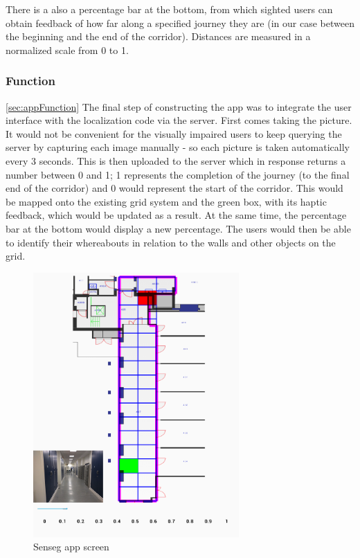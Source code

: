 There is a also a percentage bar at the bottom, from which sighted users can obtain feedback of how far along a specified journey they are (in our case between the beginning and the end of the corridor). Distances are measured in a normalized scale from 0 to 1.

\subsubsection{Function}
\ref{sec:appFunction}
The final step of constructing the app was to integrate the user interface with the localization code via the server. First comes taking the picture. It would not be convenient for the visually impaired users to keep querying the server by capturing each image manually - so each picture is taken automatically every 3 seconds. This is then uploaded to the server which in response returns a number between 0 and 1; 1 represents the completion of the journey (to the final end of the corridor) and 0 would represent the start of the corridor. This would be mapped onto the existing grid system and the green box, with its haptic feedback, which would be updated as a result. At the same time, the percentage bar at the bottom would display a new percentage. The users would then be able to identify their whereabouts in relation to the walls and other objects on the grid. 
 
\begin{figure}[t]
\centering
\includegraphics[width = 0.7\textwidth]{gfx/Chapter06/screen.png}
\caption{Senseg app screen}
\label{fig:sensegscreen}
\end{figure}
 
